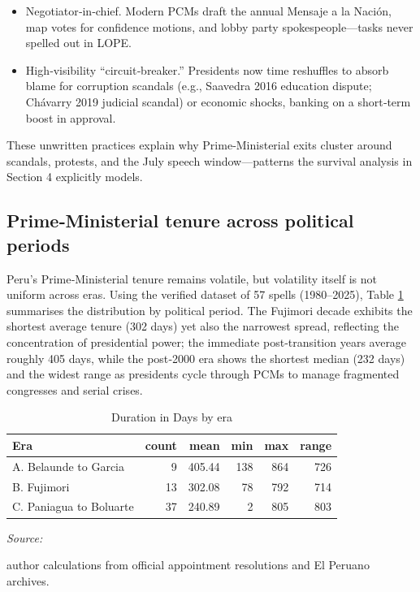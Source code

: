 \documentclass[a4paper, 12pt]{article}
\begin{document}
\begin{itemize}
\item Negotiator‑in‑chief. Modern PCMs draft the annual Mensaje a la Nación, map votes for confidence motions, and lobby party spokespeople—tasks never spelled out in LOPE.

\item High‑visibility “circuit‑breaker.” Presidents now time reshuffles to absorb blame for corruption scandals (e.g., Saavedra 2016 education dispute; Chávarry 2019 judicial scandal) or economic shocks, banking on a short‑term boost in approval.

\end{itemize}

These unwritten practices explain why Prime‑Ministerial exits cluster around scandals, protests, and the July speech window—patterns the survival analysis in Section 4 explicitly models.


\subsection{Prime‑Ministerial tenure across political periods}

Peru’s Prime‑Ministerial tenure remains volatile, but volatility itself is not uniform across eras.  Using the verified dataset of 57 spells (1980–2025), Table \ref{tab:durationPerEra} summarises the distribution by political period.  The Fujimori decade exhibits the shortest average tenure (302 days) yet also the narrowest spread, reflecting the concentration of presidential power; the immediate post‑transition years average roughly 405 days, while the post‑2000 era shows the shortest median (232 days) and the widest range as presidents cycle through PCMs to manage fragmented congresses and serial crises.



\begin{table}[!h]
\centering
\caption{Duration in Days by era\label{tab:durationPerEra}}
\centering
\begin{threeparttable}
\begin{tabular}[t]{lrrrrr}
\toprule
Era & count & mean & min & max & range\\
\midrule
A. Belaunde to Garcia & 9 & 405.44 & 138 & 864 & 726\\
B. Fujimori & 13 & 302.08 & 78 & 792 & 714\\
C. Paniagua to Boluarte & 37 & 240.89 & 2 & 805 & 803\\
\bottomrule
\end{tabular}
\begin{tablenotes}[para]
\item \textit{Source: } 
\item author calculations from official appointment resolutions and El Peruano archives.
\end{tablenotes}
\end{threeparttable}
\end{table}
\end{document}
